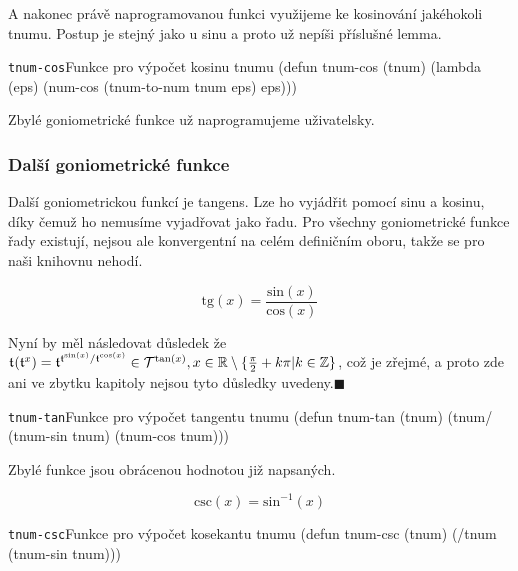 A nakonec právě naprogramovanou funkci využijeme ke kosinování jakéhokoli tnumu. Postup je stejný jako u sinu a proto už nepíši příslušné lemma.

\begin{lispcode}{\texttt{tnum-cos}}{Funkce pro výpočet kosinu tnumu}
(\textcolor{funkcionalni}{defun} \textcolor{pojmenovan}{tnum-cos} (tnum)
  (\textcolor{funkcionalni}{lambda} (eps)
    (\textcolor{moje}{num-cos} (\textcolor{moje}{tnum-to-num} tnum eps) eps)))
\end{lispcode}

Zbylé goniometrické funkce už naprogramujeme uživatelsky.

\subsubsection{Další goniometrické funkce}
Další goniometrickou funkcí je tangens. Lze ho vyjádřit pomocí sinu a kosinu, díky čemuž ho nemusíme vyjadřovat jako řadu. Pro všechny goniometrické funkce řady existují, nejsou ale konvergentní na celém definičním oboru, takže se pro naši knihovnu nehodí.
\begin{fact}
\begin{equation}
\mathrm{tg}(x)=\frac{\mathrm{sin}(x)}{\mathrm{cos}(x)}
\end{equation}
\end{fact}

\begin{convention}
Nyní by měl následovat důsledek že $\mathfrak{t}^{}(\mathfrak{t}^{x})=\mathfrak{t}^{\mathfrak{t}^{\mathrm{sin}(x)}/\mathfrak{t}^{\mathrm{cos}(x)}}\in\mathcal{T}^{\mathrm{tan}(x)},x\in\mathbb{R}\setminus\{\frac{\pi}{2}+k\pi|k\in\mathbb{Z}\}$, což je zřejmé, a proto zde ani ve zbytku kapitoly nejsou tyto důsledky uvedeny.\hfill$\blacksquare$
\end{convention}

\begin{lispcode}{\texttt{tnum-tan}}{Funkce pro výpočet tangentu tnumu}
(\textcolor{funkcionalni}{defun} \textcolor{pojmenovan}{tnum-tan} (tnum)
  (\textcolor{moje}{tnum/} (\textcolor{moje}{tnum-sin} tnum) (\textcolor{moje}{tnum-cos} tnum)))
\end{lispcode}

Zbylé funkce jsou obrácenou hodnotou již napsaných.

\begin{fact}
  \begin{equation}
    \mathrm{csc}(x)=\mathrm{sin}^{-1}(x)
  \end{equation}
\end{fact}
\begin{lispcode}{\texttt{tnum-csc}}{Funkce pro výpočet kosekantu tnumu}
(\textcolor{funkcionalni}{defun} \textcolor{pojmenovan}{tnum-csc} (tnum)
  (\textcolor{moje}{/tnum} (\textcolor{moje}{tnum-sin} tnum)))
\end{lispcode}

